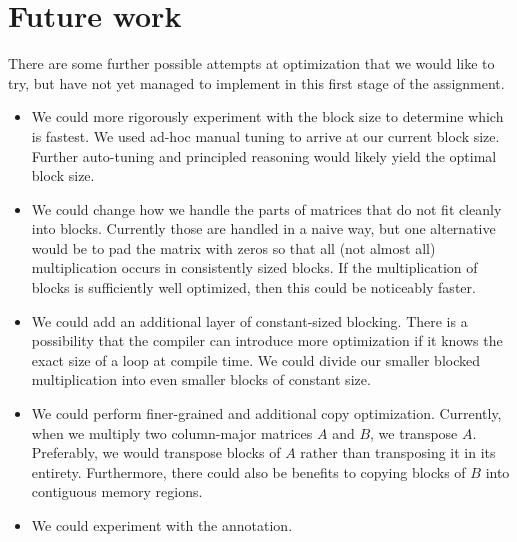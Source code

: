 \section{Future work}\label{sec:future}
There are some further possible attempts at optimization that we would like to
try, but have not yet managed to implement in this first stage of the
assignment.

\begin{itemize}
  \item
    We could more rigorously experiment with the block size to determine which
    is fastest. We used ad-hoc manual tuning to arrive at our current block
    size. Further auto-tuning and principled reasoning would likely yield the
    optimal block size.

  \item
    We could change how we handle the parts of matrices that do not fit cleanly
    into blocks. Currently those are handled in a naive way, but one
    alternative would be to pad the matrix with zeros so that all (not almost
    all) multiplication occurs in consistently sized blocks. If the
    multiplication of blocks is sufficiently well optimized, then this could be
    noticeably faster.

  \item
    We could add an additional layer of constant-sized blocking. There is a
    possibility that the compiler can introduce more optimization if it knows
    the exact size of a loop at compile time. We could divide our smaller
    blocked multiplication into even smaller blocks of constant size.

  \item
    We could perform finer-grained and additional copy optimization. Currently,
    when we multiply two column-major matrices $A$ and $B$, we transpose $A$.
    Preferably, we would transpose blocks of $A$ rather than transposing it in
    its entirety. Furthermore, there could also be benefits to copying blocks
    of $B$ into contiguous memory regions.

  \item
    We could experiment with the  annotation.
\end{itemize}
